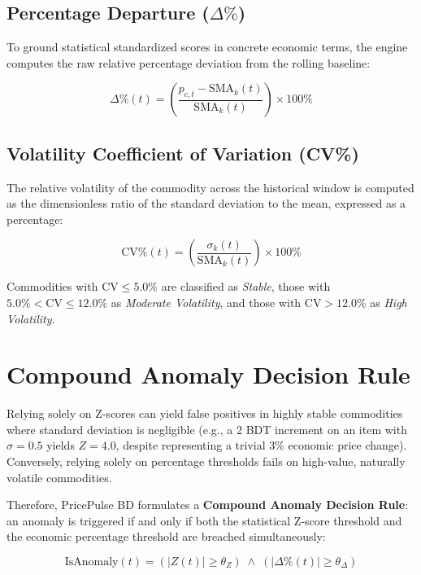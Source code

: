 \subsection{Percentage Departure ($\Delta\%$)}
To ground statistical standardized scores in concrete economic terms, the engine computes the raw relative percentage deviation from the rolling baseline:

\begin{equation}
\Delta\%(t) = \left( \frac{p_{c,t} - \text{SMA}_k(t)}{\text{SMA}_k(t)} \right) \times 100\%
\end{equation}

\subsection{Volatility Coefficient of Variation (CV\%)}
The relative volatility of the commodity across the historical window is computed as the dimensionless ratio of the standard deviation to the mean, expressed as a percentage:

\begin{equation}
\text{CV}\%(t) = \left( \frac{\sigma_k(t)}{\text{SMA}_k(t)} \right) \times 100\%
\end{equation}

Commodities with $\text{CV} \le 5.0\%$ are classified as \textit{Stable}, those with $5.0\% < \text{CV} \le 12.0\%$ as \textit{Moderate Volatility}, and those with $\text{CV} > 12.0\%$ as \textit{High Volatility}.

\section{Compound Anomaly Decision Rule}
Relying solely on Z-scores can yield false positives in highly stable commodities where standard deviation is negligible (e.g., a 2 BDT increment on an item with $\sigma = 0.5$ yields $Z = 4.0$, despite representing a trivial 3\% economic price change). Conversely, relying solely on percentage thresholds fails on high-value, naturally volatile commodities.

Therefore, PricePulse BD formulates a \textbf{Compound Anomaly Decision Rule}: an anomaly is triggered if and only if both the statistical Z-score threshold and the economic percentage threshold are breached simultaneously:

\begin{equation}
\label{eq:compound_rule}
\text{IsAnomaly}(t) = \left( |Z(t)| \ge \theta_Z \right) \;\land\; \left( |\Delta\%(t)| \ge \theta_{\Delta} \right)
\end{equation}

